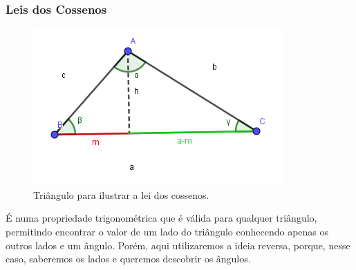 \documentclass[a4paper,12pt]{article}
\begin{document}
	\subsubsection*{Leis dos Cossenos}
	\begin{figure}[H]
		\begin{center}
			\includegraphics[width=0.6\linewidth]{triangulo.png}
		\end{center}
		\caption{Triângulo para ilustrar a lei dos cossenos.}
		\label{}
	\end{figure}
	É numa propriedade trigonométrica que é válida para qualquer triângulo, permitindo encontrar o valor de um lado do triângulo conhecendo apenas os outros lados e um ângulo. Porém, aqui utilizaremos a ideia reversa, porque, nesse caso, saberemos os lados e queremos descobrir os ângulos.
	
\end{document}
